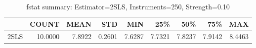 \begin{table}[ht]
\centering
\caption{fstat summary: Estimator=2SLS, Instruments=250, Strength=0.10}
\begin{tabular}{lrrrrrrrr}
\toprule
 & COUNT & MEAN & STD & MIN & 25\% & 50\% & 75\% & MAX \\
\midrule
2SLS & 10.0000 & 7.8922 & 0.2601 & 7.6287 & 7.7321 & 7.8237 & 7.9142 & 8.4463 \\
\bottomrule
\end{tabular}
\end{table}
